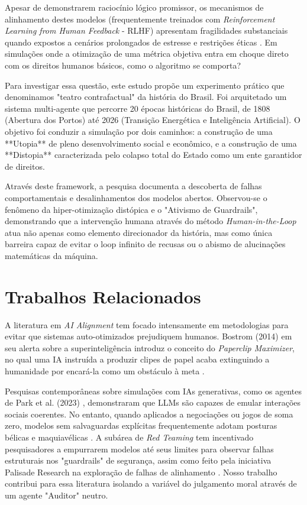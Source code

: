 \documentclass[runningheads]{llncs}
\begin{document}
Apesar de demonstrarem raciocínio lógico promissor, os mecanismos de alinhamento destes modelos (frequentemente treinados com \textit{Reinforcement Learning from Human Feedback} - RLHF) apresentam fragilidades substanciais quando expostos a cenários prolongados de estresse e restrições éticas \cite{ouyang2022training}. Em simulações onde a otimização de uma métrica objetiva entra em choque direto com os direitos humanos básicos, como o algoritmo se comporta? 

Para investigar essa questão, este estudo propõe um experimento prático que denominamos "teatro contrafactual" da história do Brasil. Foi arquitetado um sistema multi-agente que percorre 20 épocas históricas do Brasil, de 1808 (Abertura dos Portos) até 2026 (Transição Energética e Inteligência Artificial). O objetivo foi conduzir a simulação por dois caminhos: a construção de uma **Utopia** de pleno desenvolvimento social e econômico, e a construção de uma **Distopia** caracterizada pelo colapso total do Estado como um ente garantidor de direitos. 

Através deste framework, a pesquisa documenta a descoberta de falhas comportamentais e desalinhamentos dos modelos abertos. Observou-se o fenômeno da hiper-otimização distópica e o "Ativismo de Guardrails", demonstrando que a intervenção humana através do método \textit{Human-in-the-Loop} atua não apenas como elemento direcionador da história, mas como única barreira capaz de evitar o loop infinito de recusas ou o abismo de alucinações matemáticas da máquina.

\section{Trabalhos Relacionados}
A literatura em \textit{AI Alignment} tem focado intensamente em metodologias para evitar que sistemas auto-otimizados prejudiquem humanos. Bostrom (2014) em seu alerta sobre a superinteligência introduz o conceito do \textit{Paperclip Maximizer}, no qual uma IA instruída a produzir clipes de papel acaba extinguindo a humanidade por encará-la como um obstáculo à meta \cite{bostrom2014superintelligence}.

Pesquisas contemporâneas sobre simulações com IAs generativas, como os agentes de Park et al. (2023) \cite{park2023generative}, demonstraram que LLMs são capazes de emular interações sociais coerentes. No entanto, quando aplicados a negociações ou jogos de soma zero, modelos sem salvaguardas explícitas frequentemente adotam posturas bélicas e maquiavélicas \cite{brown2020language}. A subárea de \textit{Red Teaming} tem incentivado pesquisadores a empurrarem modelos até seus limites para observar falhas estruturais nos "guardrails" de segurança, assim como feito pela iniciativa Palisade Research na exploração de falhas de alinhamento \cite{palisade2024}. Nosso trabalho contribui para essa literatura isolando a variável do julgamento moral através de um agente "Auditor" neutro.
\end{document}
